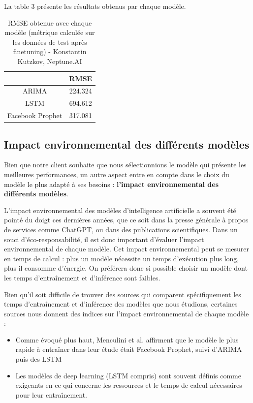 \documentclass[french]{article}
\begin{document}
    La table 3 présente les résultats obtenus par chaque modèle.
    \begin{table}[h!]
        \begin{center}
            \begin{tabular}{ |c|c| }
                \hline
                 & RMSE \\
                \hline
                ARIMA & 224.324 \\ 
                \hline
                LSTM & 694.612 \\  
                \hline
                Facebook Prophet & 317.081 \\
                \hline
            \end{tabular}
            \caption{RMSE obtenue avec chaque modèle (métrique calculée sur les données de test après finetuning) - Konstantin Kutzkov, Neptune.AI}
            \label{table:1}
        \end{center}
    \end{table}

    \subsection{Impact environnemental des différents modèles}
    Bien que notre client souhaite que nous sélectionnions le modèle qui présente les meilleures performances, un autre aspect entre en compte dans le choix du modèle le plus adapté à ses besoins : \textbf{l'impact environnemental des différents modèles}. 

    L'impact environnemental des modèles d'intelligence artificielle a souvent été pointé du doigt ces dernières années, que ce soit dans la presse générale à propos de services comme ChatGPT, ou dans des publications scientifiques\cite{shaji}. Dans un souci d'éco-responsabilité, il est donc important d'évaluer l'impact environnemental de chaque modèle. Cet impact environnemental peut se mesurer en temps de calcul : plus un modèle nécessite un temps d'exécution plus long, plus il consomme d'énergie. On préférera donc si possible choisir un modèle dont les temps d'entraînement et d'inférence sont faibles.

    Bien qu'il soit difficile de trouver des sources qui comparent spécifiquement les temps d'entraînement et d'inférence des modèles que nous étudions, certaines sources nous donnent des indices sur l'impact environnemental de chaque modèle :
    \begin{itemize}
        \item Comme évoqué plus haut, Menculini et al.\cite{menculini} affirment que le modèle le plus rapide à entraîner dans leur étude était Facebook Prophet, suivi d'ARIMA puis des LSTM
        \item Les modèles de deep learning (LSTM compris) sont souvent définis comme exigeants en ce qui concerne les ressources et le temps de calcul nécessaires pour leur entraînement\cite{thompson}.
    \end{itemize}
\end{document}
